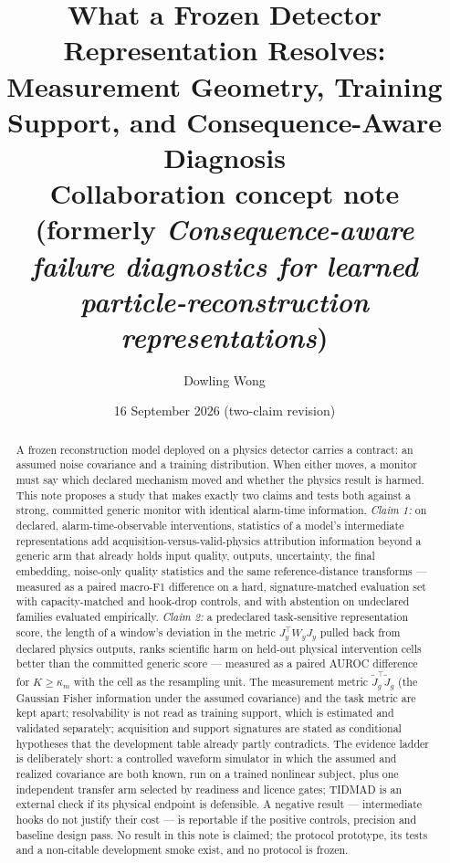 \documentclass[10pt,twocolumn]{extarticle}
\title{\vspace{-1.55em}\textbf{What a Frozen Detector Representation Resolves:\\[-0.18em]
Measurement Geometry, Training Support, and Consequence-Aware Diagnosis}\\[-0.12em]
\normalsize Collaboration concept note (formerly \emph{Consequence-aware failure diagnostics for learned particle-reconstruction representations})}
\author{Dowling Wong}
\date{16 September 2026 (two-claim revision)}
\begin{document}
\maketitle
\vspace{-1.9em}

\begin{abstract}
A frozen reconstruction model deployed on a physics detector carries a
contract: an assumed noise covariance and a training distribution. When either
moves, a monitor must say which declared mechanism moved and whether the
physics result is harmed. This note proposes a study that makes exactly two
claims and tests both against a strong, committed generic monitor with
identical alarm-time information. \emph{Claim 1:} on declared,
alarm-time-observable interventions, statistics of a model's intermediate
representations add acquisition-versus-valid-physics attribution information
beyond a generic arm that already holds input quality, outputs, uncertainty,
the final embedding, noise-only quality statistics and the same
reference-distance transforms --- measured as a paired macro-F1 difference on
a hard, signature-matched evaluation set with capacity-matched and hook-drop
controls, and with abstention on undeclared families evaluated empirically.
\emph{Claim 2:} a predeclared task-sensitive representation score, the length
of a window's deviation in the metric $J_y^{\top}W_yJ_y$ pulled back from
declared physics outputs, ranks scientific harm on held-out physical
intervention cells better than the committed generic score --- measured as a
paired AUROC difference for $K\ge\kappa_m$ with the cell as the resampling
unit. The measurement metric $\tilde J_g^{\top}\tilde J_g$ (the Gaussian
Fisher information under the assumed covariance) and the task metric are kept
apart; resolvability is not read as training support, which is estimated and
validated separately; acquisition and support signatures are stated as
conditional hypotheses that the development table already partly contradicts.
The evidence ladder is deliberately short: a controlled waveform simulator in
which the assumed and realized covariance are both known, run on a trained
nonlinear subject, plus one independent transfer arm selected by readiness and
licence gates; TIDMAD is an external check if its physical endpoint is
defensible. A negative result --- intermediate hooks do not justify their
cost --- is reportable if the positive controls, precision and baseline
design pass. No result in this note is claimed; the protocol prototype, its
tests and a non-citable development smoke exist, and no protocol is frozen.
\end{abstract}
\end{document}
